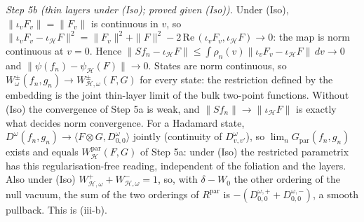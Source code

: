 \emph{Step 5b (thin layers under (Iso); proved given (Iso)).} Under (Iso), $\|\iota_{v}F_{v}\| = \|F_{v}\|$ is continuous in $v$, so $\|\iota_{v}F_{v} - \iota_{\mathcal{H}}F\|^{2} = \|F_{v}\|^{2} + \|F\|^{2} - 2\,\mathrm{Re}\,(\iota_{v}F_{v}, \iota_{\mathcal{H}}F) \to 0$: the map is norm continuous at $v = 0$. Hence $\|Sf_{n} - \iota_{\mathcal{H}}F\| \le \int\rho_{n}(v)\|\iota_{v}F_{v} - \iota_{\mathcal{H}}F\|\,dv \to 0$ and $\|\psi(f_{n}) - \psi_{\mathcal{H}}(F)\| \to 0$. States are norm continuous, so $W^{\pm}_{\omega}(f_{n}, g_{n}) \to W^{\pm}_{\mathcal{H},\omega}(F, G)$ for every state: the restriction defined by the embedding is the joint thin-layer limit of the bulk two-point functions. Without (Iso) the convergence of Step 5a is weak, and $\|Sf_{n}\| \to \|\iota_{\mathcal{H}}F\|$ is exactly what decides norm convergence. For a Hadamard state, $D^{\omega}(f_{n}, g_{n}) \to \langle F\otimes G, D^{\omega}_{0,0}\rangle$ jointly (continuity of $D^{\omega}_{v,v'}$), so $\lim_{n}G_{\mathrm{par}}(f_{n}, g_{n})$ exists and equals $W^{\mathrm{par}}_{\mathcal{H}}(F, G)$ of Step 5a: under (Iso) the restricted parametrix has this regularisation-free reading, independent of the foliation and the layers. Also under (Iso) $W^{+}_{\mathcal{H},\omega} + W^{-}_{\mathcal{H},\omega} = 1$, so, with $\delta - W_{0}$ the other ordering of the null vacuum, the sum of the two orderings of $R^{\mathrm{par}}$ is $-(D^{\omega,+}_{0,0} + D^{\omega,-}_{0,0})$, a smooth pullback. This is (iii-b).

